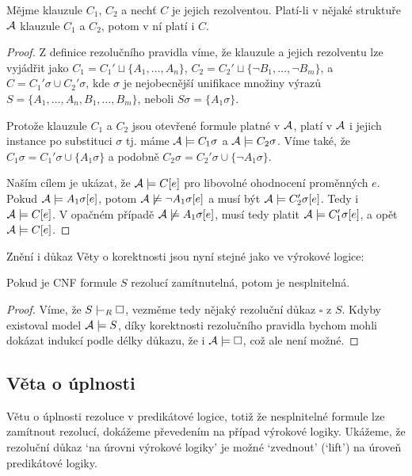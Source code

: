 \begin{proposition}
Mějme klauzule $C_1$, $C_2$ a nechť $C$ je jejich rezolventou. Platí-li v nějaké struktuře $\mathcal{A}$ klauzule $C_1$ a $C_2$, potom v ní platí i $C$.
\end{proposition}
\begin{proof}
Z definice rezolučního pravidla víme, že klauzule a jejich rezolventu lze vyjádřit jako $C_1=C_1'\sqcup \{A_1,\dots,A_n\}$, $C_2=C_2'\sqcup \{\neg B_1,\dots,\neg B_m\}$, a $C=C_1'\sigma \cup C_2'\sigma$, kde $\sigma$ je
nejobecnější unifikace množiny výrazů $S=\{A_1,\dots,A_n,B_1,\dots,B_m\}$, neboli $S\sigma=\{A_1\sigma\}$.

Protože klauzule $C_1$ a $C_2$ jsou otevřené formule platné v $\mathcal{A}$, platí v $\mathcal{A}$ i jejich instance po substituci $\sigma$ tj. máme $\mathcal{A}\models C_1\sigma$ a $\mathcal{A}\models C_2\sigma$. Víme také, že $C_1\sigma=C_1'\sigma \cup \{A_1\sigma\}$ a podobně $C_2\sigma=C_2'\sigma \cup \{\neg A_1\sigma\}$.

Naším cílem je ukázat, že $\mathcal{A}\models C[e]$ pro libovolné ohodnocení proměnných $e$. Pokud $\mathcal{A}\models A_1\sigma[e]$, potom $\mathcal{A}\not\models\neg A_1\sigma[e]$ a musí být $\mathcal{A}\models C_2'\sigma[e]$. Tedy i $\mathcal{A}\models C[e]$. V opačném případě $\mathcal{A}\not\models A_1\sigma[e]$, musí tedy platit $\mathcal{A}\models C_1'\sigma[e]$, a opět $\mathcal{A}\models C[e]$.
\end{proof}

Znění i důkaz Věty o korektnosti jsou nyní stejné jako ve výrokové logice:

\begin{theorem}\label{theorem:soundness-of-predicate-resolution}
    Pokud je CNF formule $S$ rezolucí zamítnutelná, potom je nesplnitelná.
\end{theorem}
\begin{proof}
    Víme, že $S\proves_R\square$, vezměme tedy nějaký rezoluční důkaz $\square$ z $S$. Kdyby existoval model $\mathcal{A}\models S$, díky korektnosti rezolučního pravidla bychom mohli dokázat indukcí podle délky důkazu, že i $\mathcal{A}\models\square$, což ale není možné.
\end{proof}


\subsection{Věta o úplnosti}

Větu o úplnosti rezoluce v predikátové logice, totiž že nesplnitelné formule lze zamítnout rezolucí, dokážeme převedením na případ výrokové logiky. Ukážeme, že rezoluční důkaz `na úrovni výrokové logiky' je možné `zvednout' (`lift') na úroveň predikátové logiky.

